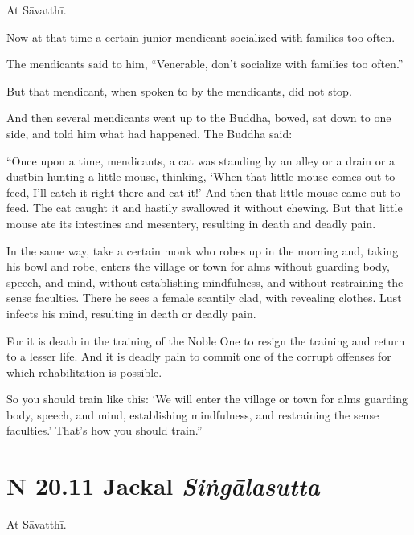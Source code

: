 \documentclass[12pt,openany]{book}%
\newcommand*{\suttatitleacronym}[1]{\smaller[2]{#1}\vspace*{.3em}}
\newcommand*{\suttatitletranslation}[1]{\linebreak{#1}}
\newcommand*{\suttatitleroot}[1]{\linebreak\smaller[2]\itshape{#1}}
\newcommand*{\tocacronym}[1]{\hspace*{-3.3em}{#1}\quad}
\newcommand*{\toctranslation}[1]{#1}
\newcommand*{\tocroot}[1]{(\textit{#1})}
\begin{document}
At \textsanskrit{Sāvatthī}. 

Now at that time a certain junior mendicant socialized with families too often. 

The mendicants said to him, “Venerable, don’t socialize with families too often.” 

But that mendicant, when spoken to by the mendicants, did not stop. 

And then several mendicants went up to the Buddha, bowed, sat down to one side, and told him what had happened. The Buddha said: 

“Once upon a time, mendicants, a cat was standing by an alley or a drain or a dustbin hunting a little mouse, thinking, ‘When that little mouse comes out to feed, I’ll catch it right there and eat it!’ And then that little mouse came out to feed. The cat caught it and hastily swallowed it without chewing. But that little mouse ate its intestines and mesentery, resulting in death and deadly pain. 

In the same way, take a certain monk who robes up in the morning and, taking his bowl and robe, enters the village or town for alms without guarding body, speech, and mind, without establishing mindfulness, and without restraining the sense faculties. There he sees a female scantily clad, with revealing clothes. Lust infects his mind, resulting in death or deadly pain. 

For it is death in the training of the Noble One to resign the training and return to a lesser life. And it is deadly pain to commit one of the corrupt offenses for which rehabilitation is possible. 

So you should train like this: ‘We will enter the village or town for alms guarding body, speech, and mind, establishing mindfulness, and restraining the sense faculties.’ That’s how you should train.” 

%
\section*{{\suttatitleacronym SN 20.11}{\suttatitletranslation A Jackal }{\suttatitleroot Siṅgālasutta}}
\addcontentsline{toc}{section}{\tocacronym{SN 20.11} \toctranslation{A Jackal } \tocroot{Siṅgālasutta}}

At \textsanskrit{Sāvatthī}. 
\end{document}
